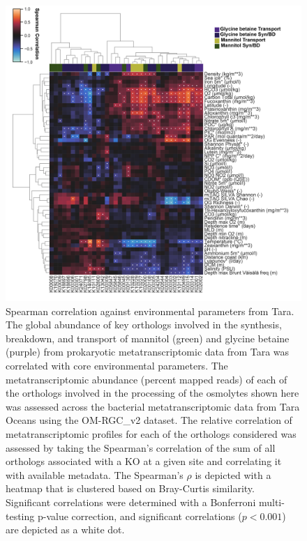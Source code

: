 \documentclass[utf8]{frontiers_suppmat} %
\begin{document}
\begin{figure}[ht]
    \centering
    \includegraphics[width=0.9\columnwidth]{Figures/SI-bact_envfeature_spearman-01.png}
    \caption{Spearman correlation against environmental parameters from Tara. The global abundance of key orthologs involved in the synthesis, breakdown, and transport of mannitol (green) and glycine betaine (purple) from prokaryotic metatranscriptomic data from Tara was correlated with core environmental parameters. The metatranscriptomic abundance (percent mapped reads) of each of the orthologs involved in the processing of the osmolytes shown here was assessed across the bacterial metatranscriptomic data from Tara Oceans using the OM-RGC\_v2 dataset. The relative correlation of metatranscriptomic profiles for each of the orthologs considered was assessed by taking the Spearman's correlation of the sum of all orthologs associated with a KO at a given site and correlating it with available metadata. The Spearman's $\rho$ is depicted with a heatmap that is clustered based on Bray-Curtis similarity. Significant correlations were determined with a Bonferroni multi-testing p-value correction, and significant correlations ($p<0.001$) are depicted as a white dot.}
    \label{fig:bact-spearman}
\end{figure}
\end{document}
